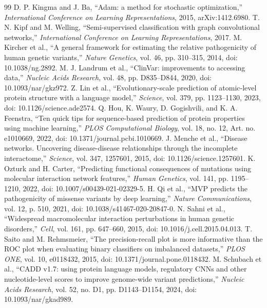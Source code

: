 \documentclass[conference]{IEEEtran}
\begin{document}
\begin{thebibliography}{99}
 D. P. Kingma and J. Ba, ``Adam: a method for stochastic optimization,'' \emph{International Conference on Learning Representations}, 2015, arXiv:1412.6980.
 T. N. Kipf and M. Welling, ``Semi-supervised classification with graph convolutional networks,'' \emph{International Conference on Learning Representations}, 2017.
 M. Kircher et al., ``A general framework for estimating the relative pathogenicity of human genetic variants,'' \emph{Nature Genetics}, vol. 46, pp. 310--315, 2014, doi: 10.1038/ng.2892.
 M. J. Landrum et al., ``ClinVar: improvements to accessing data,'' \emph{Nucleic Acids Research}, vol. 48, pp. D835--D844, 2020, doi: 10.1093/nar/gkz972.
 Z. Lin et al., ``Evolutionary-scale prediction of atomic-level protein structure with a language model,'' \emph{Science}, vol. 379, pp. 1123--1130, 2023, doi: 10.1126/science.ade2574.
 Q. Hou, K. Waury, D. Gogishvili, and K. A. Feenstra, ``Ten quick tips for sequence-based prediction of protein properties using machine learning,'' \emph{PLOS Computational Biology}, vol. 18, no. 12, Art. no. e1010669, 2022, doi: 10.1371/journal.pcbi.1010669.
 J. Menche et al., ``Disease networks. Uncovering disease-disease relationships through the incomplete interactome,'' \emph{Science}, vol. 347, 1257601, 2015, doi: 10.1126/science.1257601.
 K. Ozturk and H. Carter, ``Predicting functional consequences of mutations using molecular interaction network features,'' \emph{Human Genetics}, vol. 141, pp. 1195--1210, 2022, doi: 10.1007/s00439-021-02329-5.
 H. Qi et al., ``MVP predicts the pathogenicity of missense variants by deep learning,'' \emph{Nature Communications}, vol. 12, p. 510, 2021, doi: 10.1038/s41467-020-20847-0.
 N. Sahni et al., ``Widespread macromolecular interaction perturbations in human genetic disorders,'' \emph{Cell}, vol. 161, pp. 647--660, 2015, doi: 10.1016/j.cell.2015.04.013.
 T. Saito and M. Rehmsmeier, ``The precision-recall plot is more informative than the ROC plot when evaluating binary classifiers on imbalanced datasets,'' \emph{PLOS ONE}, vol. 10, e0118432, 2015, doi: 10.1371/journal.pone.0118432.
 M. Schubach et al., ``CADD v1.7: using protein language models, regulatory CNNs and other nucleotide-level scores to improve genome-wide variant predictions,'' \emph{Nucleic Acids Research}, vol. 52, no. D1, pp. D1143--D1154, 2024, doi: 10.1093/nar/gkad989.

\end{thebibliography}
\end{document}
